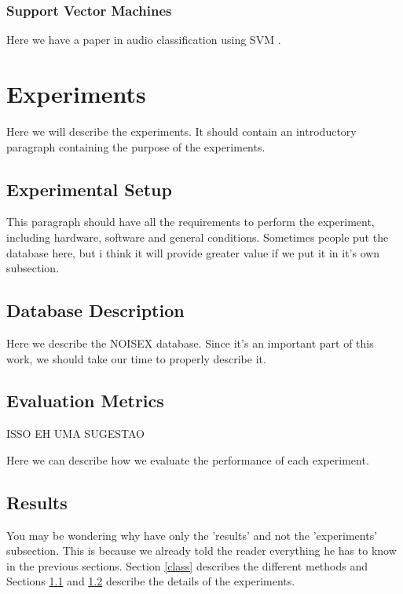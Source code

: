 \documentclass[12pt]{article}
\begin{document}
\subsubsection{Support Vector Machines} \label{class:svm}

Here we have a paper in audio classification using SVM \cite{cumani2012analysis}.



\section{Experiments} \label{exp}

Here we will describe the experiments. It should contain an introductory paragraph containing the purpose of the experiments.

\subsection{Experimental Setup} \label{exp:setup}

This paragraph should have all the requirements to perform the experiment, including hardware, software and general conditions. Sometimes people put the database here, but i think it will provide greater value if we put it in it's own subsection.

\subsection{Database Description} \label{exp:data}

Here we describe the NOISEX database. Since it's an important part of this work, we should take our time to properly describe it.

\subsection{Evaluation Metrics} \label{exp:metric}

ISSO EH UMA SUGESTAO

Here we can describe how we evaluate the performance of each experiment.

\subsection{Results} \label{exp:res}

You may be wondering why have only the 'results' and not the 'experiments' subsection. This is because we already told the reader everything he has to know in the previous sections. Section \ref{class} describes the different methods and Sections \ref{exp:setup} and \ref{exp:data} describe the details of the experiments.
\end{document}
